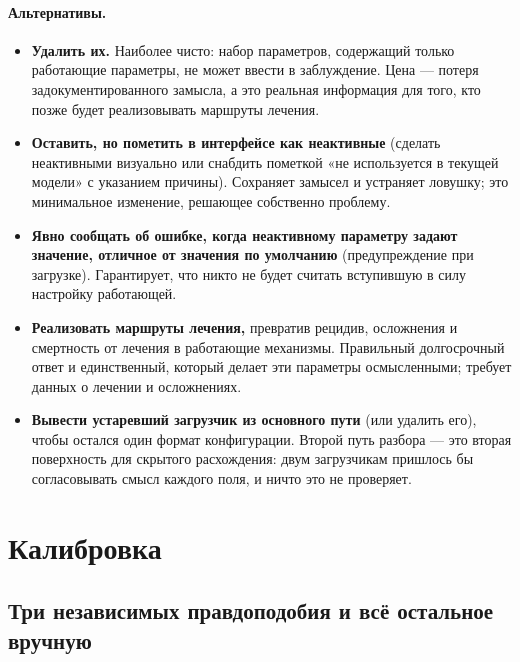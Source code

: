 \documentclass[12pt,a4paper]{article}
\newcommand{\alt}[1]{\paragraph{Альтернативы.} #1}
\begin{document}
\alt{\begin{itemize}[nosep]
  \item \textbf{Удалить их.} Наиболее чисто: набор параметров, содержащий только работающие параметры, не
        может ввести в заблуждение. Цена --- потеря задокументированного замысла, а это реальная информация
        для того, кто позже будет реализовывать маршруты лечения.
  \item \textbf{Оставить, но пометить в интерфейсе как неактивные} (сделать неактивными визуально или
        снабдить пометкой «не используется в текущей модели» с указанием причины). Сохраняет замысел и
        устраняет ловушку; это минимальное изменение, решающее собственно проблему.
  \item \textbf{Явно сообщать об ошибке, когда неактивному параметру задают значение, отличное от значения по
        умолчанию} (предупреждение при загрузке). Гарантирует, что никто не будет считать вступившую в силу
        настройку работающей.
  \item \textbf{Реализовать маршруты лечения,} превратив рецидив, осложнения и смертность от лечения в
        работающие механизмы. Правильный долгосрочный ответ и единственный, который делает эти параметры
        осмысленными; требует данных о лечении и осложнениях.
  \item \textbf{Вывести устаревший загрузчик из основного пути} (или удалить его), чтобы остался один формат
        конфигурации. Второй путь разбора --- это вторая поверхность для скрытого расхождения: двум
        загрузчикам пришлось бы согласовывать смысл каждого поля, и ничто это не проверяет.
\end{itemize}}

\section{Калибровка}
\label{sec:calib}

\subsection{Три независимых правдоподобия и всё остальное вручную}
\end{document}
